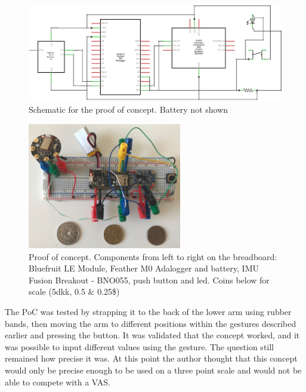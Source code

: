 \begin{figure}[h!]
    \centering
    \includegraphics[width=1\textwidth]{figures/Sketch_schem.png}
    \caption{Schematic for the proof of concept. Battery not shown}
    \label{sketch_schem}
\end{figure}

\begin{figure}[h!]
    \centering
    \includegraphics[width=0.6\textwidth]{figures/poc.jpg}
    \caption{Proof of concept. Components from left to right on the breadboard: Bluefruit LE Module, Feather M0 Adalogger and battery, IMU Fusion Breakout - BNO055, push button and led. Coins below for scale (5dkk, 0.5\EURtm{} \& 0.25\$)}
    \label{poc}
\end{figure}

The PoC was tested by strapping it to the back of the lower arm using rubber bands, then moving the arm to different positions within the gestures described earlier and pressing the button. It was validated that the concept worked, and it was possible to input different values using the gesture. The question still remained how precise it was. At this point the author thought that this concept would only be precise enough to be used on a three point scale and would not be able to compete with a VAS.

